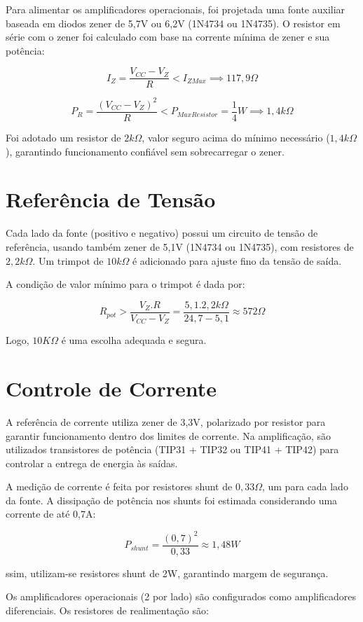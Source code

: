 \documentclass[
	12pt,				%
	oneside,			%
	a4paper,			%
	chapter=TITLE,
	sumario=tradicional,
	english,			%
	brazil				%
]{abntex2}
\begin{document}
Para alimentar os amplificadores operacionais, foi projetada uma fonte auxiliar baseada em diodos zener de 5,7V ou 6,2V (1N4734 ou 1N4735). O resistor em série com o zener foi calculado com base na corrente mínima de zener e sua potência:

$$I_Z = \frac{V_{CC} - V_Z}{R} < I_{ZMax} \implies 117,9\Omega$$

$$P_R = \frac{(V_{CC} - V_Z)^2}{R} < P_{MaxResistor} = \frac{1}{4}W \implies 1,4k\Omega$$

Foi adotado um resistor de \(2k\Omega\), valor seguro acima do mínimo necessário (\(1,4k\Omega\)), garantindo funcionamento confiável sem sobrecarregar o zener.

\section{Referência de Tensão}

Cada lado da fonte (positivo e negativo) possui um circuito de tensão de referência, usando também zener de 5,1V (1N4734 ou 1N4735), com resistores de \(2,2k\Omega\). Um trimpot de \(10k\Omega\) é adicionado para ajuste fino da tensão de saída.

A condição de valor mínimo para o trimpot é dada por:

$$R_{pot} > \frac{V_Z.R}{V_{CC} - V_Z} = \frac{5,1.2,2k\Omega}{24,7-5,1} \approx 572\Omega$$

Logo, \(10K\Omega\) é uma escolha adequada e segura.

\section{Controle de Corrente}

A referência de corrente utiliza zener de 3,3V, polarizado por resistor para garantir funcionamento dentro dos limites de corrente. Na amplificação, são utilizados transistores de potência (TIP31 + TIP32 ou TIP41 + TIP42) para controlar a entrega de energia às saídas.

A medição de corrente é feita por resistores shunt de \(0,33\Omega\), um para cada lado da fonte. A dissipação de potência nos shunts foi estimada considerando uma corrente de até 0,7A:

$$P_{shunt} = \frac{(0,7)^2}{0,33} \approx1,48W$$

ssim, utilizam-se resistores shunt de 2W, garantindo margem de segurança.

Os amplificadores operacionais (2 por lado) são configurados como amplificadores diferenciais. Os resistores de realimentação são:
\end{document}
